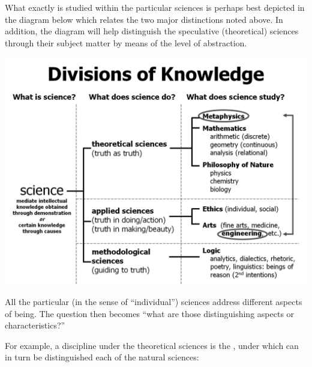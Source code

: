 What exactly is studied within the particular sciences is perhaps best depicted in the diagram below which relates the two major distinctions noted above. In addition, the diagram will help distinguish the speculative (theoretical) sciences through their subject matter by means of the level of abstraction.

\begin{center}
\includegraphics[scale=0.6]{sich_science_taxonomy.jpg}
\end{center}

All the particular (in the sense of ``individual'') sciences address different aspects of being. The question then becomes ``what are those  distinguishing aspects or characteristics?''

For example, a discipline under the theoretical sciences is the , under which can in turn be distinguished each of the natural sciences:


